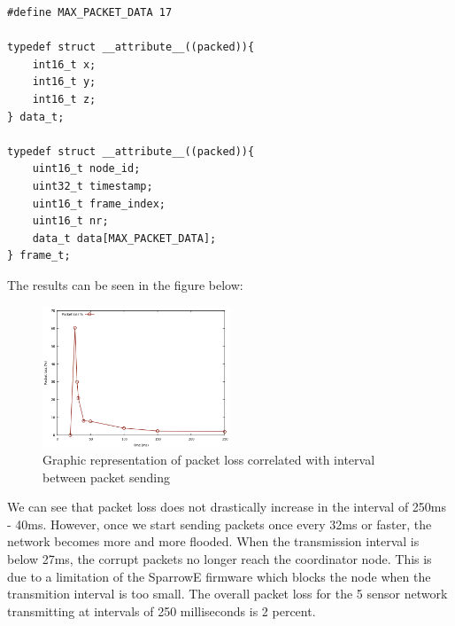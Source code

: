 \begin{lstlisting}
#define MAX_PACKET_DATA 17

typedef struct __attribute__((packed)){
	int16_t x;
	int16_t y;
	int16_t z;
} data_t;

typedef struct __attribute__((packed)){
	uint16_t node_id;
	uint32_t timestamp;
	uint16_t frame_index;
	uint16_t nr;
	data_t data[MAX_PACKET_DATA];
} frame_t;
\end{lstlisting}

The results can be seen in the figure below:

\begin{figure}[ht] \centering
  \includegraphics[width=0.5\textwidth]{img/packet-loss.png}
  \caption{Graphic representation of packet loss correlated with interval between packet sending}
\end{figure}

We can see that packet loss does not drastically increase in the interval of 250ms - 40ms. However, 
once we start sending packets once every 32ms or faster, the network becomes more and more flooded.
When the transmission interval is below 27ms, the corrupt packets no longer reach the coordinator
node. This is due to a limitation of the SparrowE firmware which blocks the node when the transmition 
interval is too small. The overall packet loss for the 5 sensor network transmitting at 
intervals of 250 milliseconds is 2 percent.
